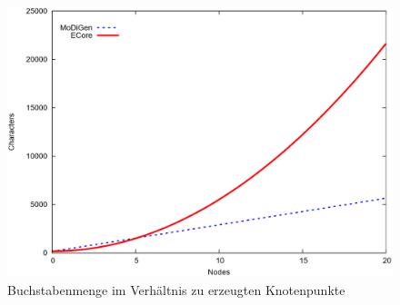\begin{figure}[H]
\centering
\includegraphics[width=\linewidth]{Abschnitte/Abbildungen/Grafiken/Characters-and-Nodes}
\caption{Buchstabenmenge im Verhältnis zu erzeugten Knotenpunkte}
\label{fig:Characters-and-Nodes}
\end{figure}
